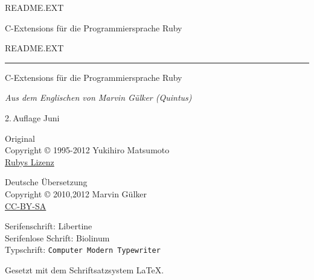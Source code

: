 \begin{titlepage}\sffamily
  \begingroup\Large README.EXT\endgroup\par
  C-Extensions für die Programmiersprache Ruby
\end{titlepage}


\begin{titlepage}\centering
  \begingroup\Huge{README.EXT}\endgroup\\
  \rule{\textwidth}{2pt}

  \vspace{\baselineskip}

  \noindent\begingroup\LARGE C-Extensions für die Programmiersprache Ruby\endgroup

  \vspace{0.5\baselineskip}

  \noindent\textit{Aus dem Englischen von Marvin Gülker (Quintus)}

  \vspace{\baselineskip}

  \begingroup\footnotesize
  2.\,Auflage Juni \the\year %
  \endgroup

  \vspace{\baselineskip}

  \vfill

  \begin{minipage}{0.45\linewidth}\raggedright\footnotesize
    Original\\
    Copyright © 1995-2012 Yukihiro Matsumoto\\
    \href{http://www.ruby-lang.org/de/about/license.txt}{Rubys Lizenz}
  \end{minipage}
  \hfill
  \begin{minipage}{0.45\linewidth}\raggedleft\footnotesize
    Deutsche Übersetzung\\
    Copyright © 2010,2012 Marvin Gülker\\
    \href{http://creativecommons.org/licenses/by-sa/3.0/de/}{CC-BY-SA}
  \end{minipage}

  \newpage\thispagestyle{empty}

  \begin{flushleft}
    \vspace*{\fill}
    \noindent Serifenschrift: Libertine\\
    Serifenlose Schrift: \textsf{Biolinum}\\
    Typschrift: \texttt{Computer Modern Typewriter}

    \vspace{\baselineskip}

    \noindent Gesetzt mit dem Schriftsatzsystem \LaTeX.
  \end{flushleft}
\end{titlepage}

